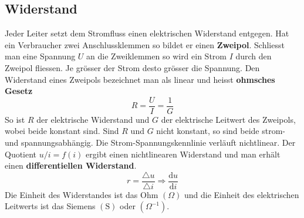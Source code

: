 \subsection{Widerstand}
Jeder Leiter setzt dem Stromfluss einen elektrischen Widerstand entgegen. Hat ein Verbraucher zwei Anschlussklemmen so bildet er einen \textbf{Zweipol}. Schliesst man eine Spannung $U$ an die Zweiklemmen so wird ein Strom $I$ durch den Zweipol fliessen. Je grösser der Strom desto grösser die Spannung. Den Widerstand eines Zweipols bezeichnet man als linear und heisst \textbf{ohmsches Gesetz}
\begin{equation}
\boxed{R=\dfrac{U}{I}=\dfrac{1}{G}}
\end{equation}
So ist $R$ der elektrische Widerstand und $G$ der elektrische Leitwert des Zweipols, wobei beide konstant sind. Sind $R$ und $G$ nicht konstant, so sind beide strom- und spannungsabhängig. Die Strom-Spannungskennlinie verläuft nichtlinear. Der Quotient $u/i=f\left(i\right)$ ergibt einen nichtlinearen Widerstand und man erhält einen \textbf{differentiellen Widerstand}.
\begin{equation}
\boxed{r=\dfrac{\triangle u}{\triangle i}\Longrightarrow \dfrac{\text{d}u}{\text{d}i}}
\end{equation}
Die Einheit des Widerstandes ist das Ohm $\left(\Omega\right)$ und die Einheit des elektrischen Leitwerts ist das Siemens $\left(\text{S}\right)$ oder $\left(\Omega^{-1}\right)$.
